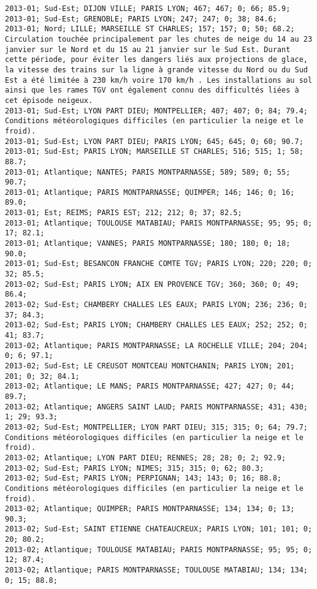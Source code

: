 \documentclass{article}
\begin{document}
\begin{Verbatim}[commandchars=\\\{\}]
2013-01; Sud-Est; DIJON VILLE; PARIS LYON; 467; 467; 0; 66; 85.9; 
2013-01; Sud-Est; GRENOBLE; PARIS LYON; 247; 247; 0; 38; 84.6; 
2013-01; Nord; LILLE; MARSEILLE ST CHARLES; 157; 157; 0; 50; 68.2; Circulation touchée principalement par les chutes de neige du 14 au 23 janvier sur le Nord et du 15 au 21 janvier sur le Sud Est. Durant cette période, pour éviter les dangers liés aux projections de glace, la vitesse des trains sur la ligne à grande vitesse du Nord ou du Sud Est a été limitée à 230 km/h voire 170 km/h . Les installations au sol ainsi que les rames TGV ont également connu des difficultés liées à cet épisode neigeux.
2013-01; Sud-Est; LYON PART DIEU; MONTPELLIER; 407; 407; 0; 84; 79.4; Conditions météorologiques difficiles (en particulier la neige et le froid).
2013-01; Sud-Est; LYON PART DIEU; PARIS LYON; 645; 645; 0; 60; 90.7; 
2013-01; Sud-Est; PARIS LYON; MARSEILLE ST CHARLES; 516; 515; 1; 58; 88.7; 
2013-01; Atlantique; NANTES; PARIS MONTPARNASSE; 589; 589; 0; 55; 90.7; 
2013-01; Atlantique; PARIS MONTPARNASSE; QUIMPER; 146; 146; 0; 16; 89.0; 
2013-01; Est; REIMS; PARIS EST; 212; 212; 0; 37; 82.5; 
2013-01; Atlantique; TOULOUSE MATABIAU; PARIS MONTPARNASSE; 95; 95; 0; 17; 82.1; 
2013-01; Atlantique; VANNES; PARIS MONTPARNASSE; 180; 180; 0; 18; 90.0; 
2013-01; Sud-Est; BESANCON FRANCHE COMTE TGV; PARIS LYON; 220; 220; 0; 32; 85.5; 
2013-02; Sud-Est; PARIS LYON; AIX EN PROVENCE TGV; 360; 360; 0; 49; 86.4; 
2013-02; Sud-Est; CHAMBERY CHALLES LES EAUX; PARIS LYON; 236; 236; 0; 37; 84.3; 
2013-02; Sud-Est; PARIS LYON; CHAMBERY CHALLES LES EAUX; 252; 252; 0; 41; 83.7; 
2013-02; Atlantique; PARIS MONTPARNASSE; LA ROCHELLE VILLE; 204; 204; 0; 6; 97.1; 
2013-02; Sud-Est; LE CREUSOT MONTCEAU MONTCHANIN; PARIS LYON; 201; 201; 0; 32; 84.1; 
2013-02; Atlantique; LE MANS; PARIS MONTPARNASSE; 427; 427; 0; 44; 89.7; 
2013-02; Atlantique; ANGERS SAINT LAUD; PARIS MONTPARNASSE; 431; 430; 1; 29; 93.3; 
2013-02; Sud-Est; MONTPELLIER; LYON PART DIEU; 315; 315; 0; 64; 79.7; Conditions météorologiques difficiles (en particulier la neige et le froid).
2013-02; Atlantique; LYON PART DIEU; RENNES; 28; 28; 0; 2; 92.9; 
2013-02; Sud-Est; PARIS LYON; NIMES; 315; 315; 0; 62; 80.3; 
2013-02; Sud-Est; PARIS LYON; PERPIGNAN; 143; 143; 0; 16; 88.8; Conditions météorologiques difficiles (en particulier la neige et le froid).
2013-02; Atlantique; QUIMPER; PARIS MONTPARNASSE; 134; 134; 0; 13; 90.3; 
2013-02; Sud-Est; SAINT ETIENNE CHATEAUCREUX; PARIS LYON; 101; 101; 0; 20; 80.2; 
2013-02; Atlantique; TOULOUSE MATABIAU; PARIS MONTPARNASSE; 95; 95; 0; 12; 87.4; 
2013-02; Atlantique; PARIS MONTPARNASSE; TOULOUSE MATABIAU; 134; 134; 0; 15; 88.8; 

\end{Verbatim}
\end{document}
